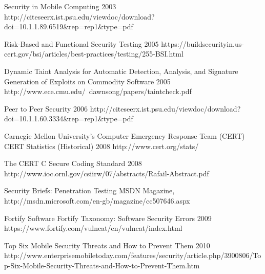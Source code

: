 \begin{thebibliography}{9}
		{
			\BibAnd
			\BibAnd
			\BibAnd
			}
		{Security in Mobile Computing}	
		{2003}	
		{http://citeseerx.ist.psu.edu/viewdoc/download?doi=10.1.1.89.6519\&rep=rep1\&type=pdf}

		{
			\BibAnd
			}
		{Risk-Based and Functional Security Testing}	
		{2005}	
		{https://buildsecurityin.us-cert.gov/bsi/articles/best-practices/testing/255-BSI.html}

		{
			\BibAnd
			}
		{Dynamic Taint Analysis for Automatic Detection, Analysis, and Signature Generation of Exploits on Commodity Software}	
		{2005}	
		{http://www.ece.cmu.edu/~dawnsong/papers/taintcheck.pdf}
	
		{}
		{Peer to Peer Security}	
		{2006}
		{http://citeseerx.ist.psu.edu/viewdoc/download?doi=10.1.1.60.3334\&rep=rep1\&type=pdf}


		{Carnegie Mellon University's Computer Emergency Response Team (CERT)}
		{CERT Statistics (Historical)}
		{2008}
		{http://www.cert.org/stats/}
				
		{
			\BibAnd
			}
		{The {CERT} {C} Secure Coding Standard}
		{2008}
		{http://www.ioc.ornl.gov/csiirw/07/abstracts/Rafail-Abstract.pdf}

		{}
		{Security Briefs: Penetration Testing}
		{MSDN Magazine, }
		{http://msdn.microsoft.com/en-gb/magazine/cc507646.aspx}

		{Fortify Software}
		{Fortify Taxonomy: Software Security Errors}
		{2009}
		{https://www.fortify.com/vulncat/en/vulncat/index.html}
		
		{}
		{Top Six Mobile Security Threats and How to Prevent Them}
		{2010}
		{http://www.enterprisemobiletoday.com/features/security/article.php/3900806/Top-Six-Mobile-Security-Threats-and-How-to-Prevent-Them.htm}
		

\end{thebibliography}
